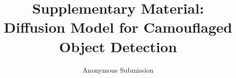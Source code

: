 \documentclass{ecai}
\begin{document}
\begin{frontmatter}

\title{Supplementary Material: \\Diffusion Model for Camouflaged Object Detection}
\author{Anonymous Submission}










\end{frontmatter}
\end{document}
